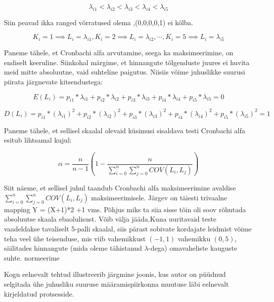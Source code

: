 \documentclass[a4paper,12pt]{article}
\numberwithin{equation}{section}
\theoremstyle{definition}
\begin{document}
\begin{equation*}
\lambda_{i1} < \lambda_{i2}  < \lambda_{i3} < \lambda_{i4} < \lambda_{i5}
\end{equation*}

{\color{cyan} Siin peavad ikka ranged võrratused olema ,(0,0,0,0,1) ei kõlba.}

\begin{equation*}
K_i = 1 \implies L_i = \lambda_{i1}, K_i = 2 \implies L_i = \lambda_{i2},\cdots, K_i = 5 \implies L_i =\lambda_{i5}
\end{equation*}

Paneme tähele, et Cronbachi alfa arvutamine, seega ka maksimeerimine, on endiselt keeruline. Siinkohal märgime, et hinnangute tõlgenduste juures ei huvita meid mitte absoluutne, vaid suhteline paigutus. Niisiis võime juhuslikke suurusi piirata järgnevate kitsendustega:


\begin{equation}
E(L_i) = p_{i1}*\lambda_{i1}+p_{i2}*\lambda_{i2}+p_{i3}*\lambda_{i3}+
p_{i4}*\lambda_{i4}+p_{i5}*\lambda_{i5}=0
\end{equation}

\begin{equation}
D(L_i) = 
p_{i1}*(\lambda_{i1})^2+ p_{i2}*(\lambda_{i2})^2 + p_{i3}*(\lambda_{i3})^2 + p_{i4}*(\lambda_{i4})^2 + p_{i5}*(\lambda_{i5})^2 = 1 
\end{equation}


Paneme tähele, et sellisel skaalal olevaid k\"usimusi sisaldava testi Cronbachi alfa esitub lihtsamal kujul:

\begin{equation}
\alpha = \frac{n}{n-1}\left(1 - \frac
{n}{\sum \limits_{i=0}^n \sum \limits_{j=0}^n COV(L_i,L_j)}\right)
\end{equation}

Siit näeme, et sellisel juhul taandub Cronbachi alfa maksimeerimine avaldise $\sum \limits_{i=0}^n \sum \limits_{j=0}^n COV(L_i,L_j)$ maksimeerimisele. {\color{cyan} Järgev on täiesti trivaalne mapping Y = (X+1)*2 +1 vms. Põhjus miks ta siia sisse tõin oli soov rõhutada absoluutse skaala ebaolulisust. Võib välja jääda.}Kuna uuritavaid teste vaadeldakse tavaliselt 5-palli skaalal, siis pärast sobivate kordajate leidmist võime teha veel \"uhe teisenduse, mis viib vahemikkust $(-1,1)$ vahemikku $(0,5)$, säilitades hinnangute (mida oleme tähistanud $\lambda$-dega) omavaheliste kauguste suhte. {\color{cyan} normeerime } 

Kogu eelnevalt tehtud illustreerib järgmine joonis, kus autor on p\"u\"udnud selgitada \"uhe juhusliku suuruse määramispiirkonna muutuse läbi eelnevalt kirjeldatud protsesside. 
\end{document}
